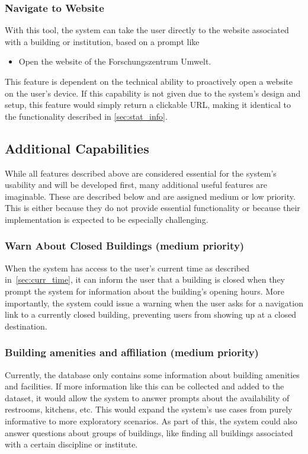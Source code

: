 \documentclass{article}
\begin{document}
\subsubsection{Navigate to Website}
With this tool, the system can take the user directly to the website associated with a building or institution, based on a prompt like
  \begin{itemize}
    \item Open the website of the Forschungszentrum Umwelt.
  \end{itemize}
This feature is dependent on the technical ability to proactively open a website on the user's device. If this capability is not given due to the system's design and setup, this feature would simply return a clickable URL, making it identical to the functionality described in \cref{sec:stat_info}.

\subsection{Additional Capabilities}
While all features described above are considered essential for the system's usability and will be developed first, many additional useful features are imaginable. These are described below and are assigned medium or low priority. This is either because they do not provide essential functionality or because their implementation is expected to be especially challenging.

\subsubsection{Warn About Closed Buildings (medium priority)} \label{sec:warn_times}
When the system has access to the user's current time as described in~\cref{sec:curr_time}, it can inform the user that a building is closed when they prompt the system for information about the building's opening hours. More importantly, the system could issue a warning when the user asks for a navigation link to a currently closed building, preventing users from showing up at a closed destination.

\subsubsection{Building amenities and affiliation (medium priority)}
Currently, the database only contains some information about building amenities and facilities. If more information like this can be collected and added to the dataset, it would allow the system to answer prompts about the availability of restrooms, kitchens, etc. This would expand the system's use cases from purely informative to more exploratory scenarios. As part of this, the system could also answer questions about groups of buildings, like finding all buildings associated with a certain discipline or institute.
\end{document}
